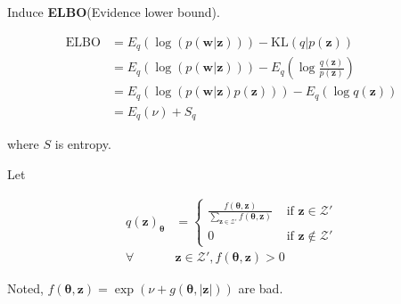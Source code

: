 \documentclass[notitlepage]{article}
\begin{document}
Induce \textbf{ELBO}(Evidence lower bound). 

\begin{align}
    \mathrm{ELBO} &= E_q(\log(p(\bm{w}|\bm{z}))) - \mathrm{KL}(q|p(\bm{z})) \\
    &= E_q(\log(p(\bm{w}|\bm{z}))) - E_q(\log\frac{q(\bm{z})}{p(\bm{z})}) \\
    &= E_q(\log(p(\bm{w}|\bm{z})p(\bm{z}))) - E_q(\log q(\bm{z})) \\
    &= E_q(\nu) + S_q
\end{align}

where $S$ is entropy. 

Let

\begin{align}
    q(\bm{z})_{\bm{\theta}} &= \begin{cases}
        \frac{f(\bm{\theta},\bm{z})}{\sum_{\bm{z}\in\mathcal{Z}'}f(\bm{\theta},\bm{z})} & \text{ if } \bm{z} \in \mathcal{Z}' \\ 
        0 & \text{ if } \bm{z} \notin \mathcal{Z}'
    \end{cases} \\
    \forall &\bm{z}\in\mathcal{Z}', f(\bm{\theta},\bm{z}) > 0
\end{align}

Noted, $f(\bm{\theta},\bm{z})=\exp{(\nu+g(\bm{\theta},|\bm{z}|))}$ are bad. 
\end{document}
